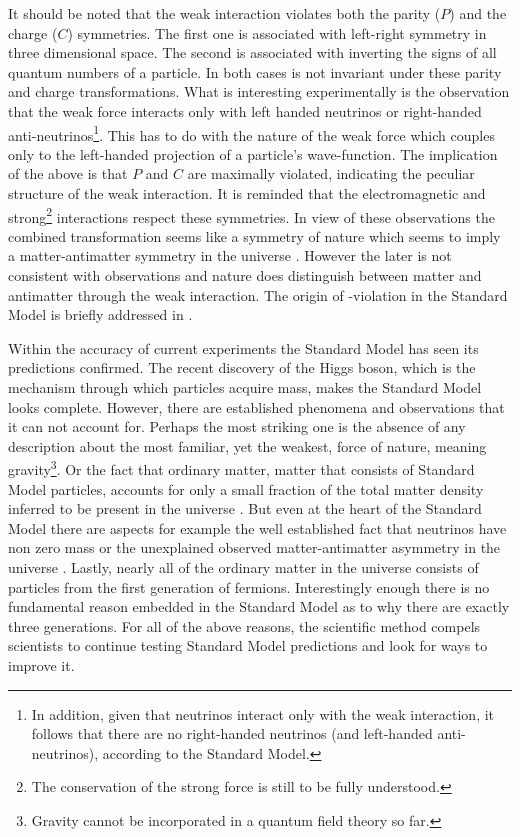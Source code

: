 It should be noted that the weak interaction violates both the parity ($P$) and the charge ($C$) symmetries.
The first one is associated with left-right symmetry in three dimensional space.
The second is associated with inverting the signs of all quantum numbers of a particle.
In both cases  is not invariant under these parity and charge transformations. What is interesting experimentally
is the observation \cite{wu-parity,garwin-parity} that the weak force interacts only with left handed neutrinos or right-handed
anti-neutrinos\footnote{In addition, given that neutrinos interact only with the weak interaction, it follows that there are no
right-handed neutrinos (and left-handed anti-neutrinos), according to the Standard Model.}. This has to do with the nature of
the weak force which couples only to the left-handed projection of a particle's
wave-function. The implication of the above is that $P$ and $C$ are maximally violated, indicating the
peculiar structure of the weak interaction. It is reminded that the electromagnetic and
strong\footnote{The \CP conservation of the strong force is still to be fully understood.} interactions
respect these symmetries. In view of these observations the combined \CP transformation
seems like a symmetry of nature which seems to imply a matter-antimatter symmetry in the universe \cite{Sakharov:1967dj}.
However the later is not consistent with observations and nature does distinguish between matter and antimatter through
the weak interaction. The origin of \CP-violation in the Standard Model is briefly addressed in .

Within the accuracy of current experiments the Standard Model has seen its predictions confirmed.
The recent discovery of the Higgs boson, which is the mechanism through which particles acquire mass, makes the Standard Model looks
complete. However, there are established phenomena and observations that it can not
account for. Perhaps the most striking one is the absence of any description about the most familiar, yet the weakest, force of nature,
meaning gravity\footnote{Gravity cannot be incorporated in a quantum field theory so far.}.
Or the fact that ordinary matter, \ie matter that consists of Standard Model particles, accounts for only a small
fraction of the total matter density inferred to be present in the universe \cite{dmatter-Hinshaw}. But even at the heart
of the Standard Model there are aspects for example the well established fact that neutrinos have non zero
mass \cite{nu-mass-superkam,nu-mass-kamland,nu-mass-sno,nu-mass-daya} or the unexplained observed
matter-antimatter asymmetry in the universe \cite{more-cpv-huet,more-cpv-gavela_I,more-cpv-gavela_II}.
Lastly, nearly all of the ordinary matter in the universe consists of
particles from the first generation of fermions. Interestingly enough there is no fundamental reason embedded in the Standard Model
as to why there are exactly three generations. For all of the above reasons, the scientific method compels scientists to continue
testing Standard Model predictions and look for ways to improve it.
